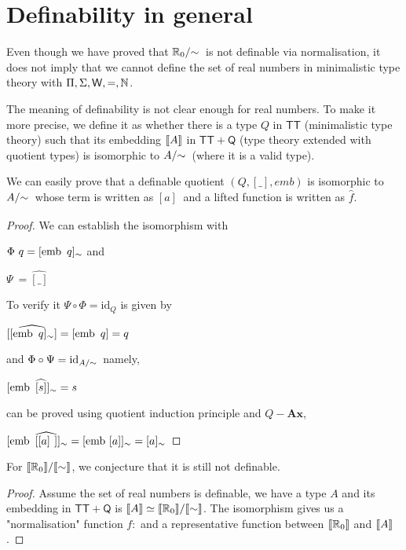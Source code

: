 \section{Definability in general}


Even though we have proved that $\qset{\R_0}$ is not definable via normalisation, it does not imply that we cannot define the set of real numbers in minimalistic type theory with $\Pi, \Sigma, \mathsf{W}, =,
\mathbb{N}$. 

The meaning of definability is not clear enough for real numbers. To make it more precise, we define
it as whether there is a type $Q$ in $\mathsf{TT}$ (minimalistic type
theory) such that its embedding $\llbracket A\rrbracket$ in $\mathsf{TT} + \mathsf{Q}$ (type theory
extended with quotient types) is isomorphic to $\qset{A}$ (where it is a valid type). 



We can easily prove that a definable quotient $(Q, [\_], emb)$ is isomorphic to $\qset{A}$ whose term is written as $[ a ]_{~}$ and a lifted function is written as $\hat{f}$.

\begin{proof}
We can establish the isomorphism with

$\Phi ~q =  [ \operatorname{emb} ~q ]_{\sim}$ and 

$\Psi ~ = \widehat{[\_]}$

To verify it $\Psi \circ \Phi = \text{id}_{Q}$ is given by

$\widehat{[  [ \operatorname{emb} ~q ]_{\sim} ]} = [\operatorname{emb} ~ q] = q$

and $\Phi \circ \Psi = \text{id}_{\qset{A}}$ namely,

$[\operatorname{emb}~\widehat{[s]}]_{\sim} = s$

can be proved using quotient induction principle and $Q-\textbf{Ax}$,

$[\operatorname{emb}~\widehat{[ [a]_{~} ]}]_{\sim} = [\operatorname{emb}~[a]]_{\sim} = [a]_{\sim}$

\end{proof}


For $\llbracket \mathbb{R}_0\rrbracket/ \llbracket \sim\rrbracket$, we conjecture that it is still not
definable.

\begin{proof}
Assume the set of real numbers is definable, we have a type $A$ and
its embedding in $\mathsf{TT} + \mathsf{Q}$  is $\llbracket A\rrbracket \simeq \llbracket \mathbb{R}_0\rrbracket/ \llbracket \sim\rrbracket$. The isomorphism gives us a "normalisation" function $f : $ and a representative function
between $\llbracket \mathbb{R}_0\rrbracket$ and $\llbracket A\rrbracket$.
\end{proof}







